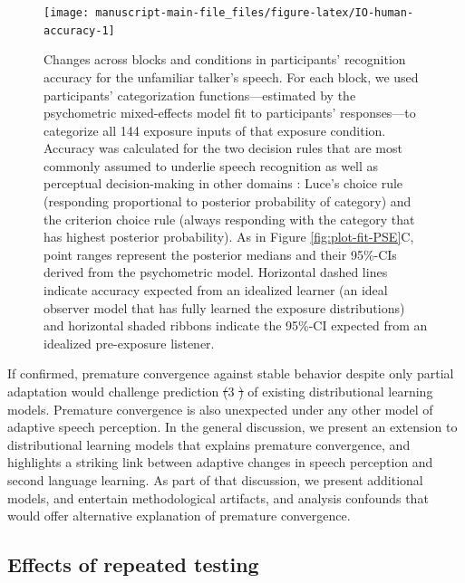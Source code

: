 \documentclass[
  11pt,
  man,mask,floatsintext]{apa6}
\makeatletter
\providecommand{\DIFdel}[1]{{\protect\color{red}\sout{#1}}} %
\providecommand{\DIFdelbegin}{} %
\providecommand{\DIFdelend}{} %
\newcommand{\DIFscaledelfig}{0.5}
\newlength{\DIFdelgraphicswidth} %
\newlength{\DIFdelgraphicsheight} %
\newcommand{\DIFdelincludegraphics}[2][]{%
\sbox{\DIFdelgraphicsbox}{\DIFOincludegraphics[#1]{#2}}%
\settoboxwidth{\DIFdelgraphicswidth}{\DIFdelgraphicsbox} %
\settoboxtotalheight{\DIFdelgraphicsheight}{\DIFdelgraphicsbox} %
\scalebox{\DIFscaledelfig}{%
\parbox[b]{\DIFdelgraphicswidth}{\usebox{\DIFdelgraphicsbox}\\[-\baselineskip] \rule{\DIFdelgraphicswidth}{0em}}\llap{\resizebox{\DIFdelgraphicswidth}{\DIFdelgraphicsheight}{%
\setlength{\unitlength}{\DIFdelgraphicswidth}%
\begin{picture}(1,1)%
\thicklines\linethickness{2pt} %
{\color[rgb]{1,0,0}\put(0,0){\framebox(1,1){}}}%
{\color[rgb]{1,0,0}\put(0,0){\line( 1,1){1}}}%
{\color[rgb]{1,0,0}\put(0,1){\line(1,-1){1}}}%
\end{picture}%
}\hspace*{3pt}}} %
} %
\DeclareRobustCommand{\DIFdelbegin}{\DIFOdelbegin \let\includegraphics\DIFdelincludegraphics} %
\DeclareRobustCommand{\DIFdelend}{\DIFOaddend \let\includegraphics\DIFOincludegraphics} %
\let\sout@orig\sout %
\renewcommand{\sout}[1]{\ifmmode\text{\sout@orig{\ensuremath{#1}}}\else\sout@orig{#1}\fi} %
\makeatother
\begin{document}
\begin{figure}[!ht]

{\centering \texttt{[image: manuscript-main-file\_files/figure-latex/IO-human-accuracy-1]} 

}

\caption{Changes across blocks and conditions in participants' recognition accuracy for the unfamiliar talker's speech. For each block, we used participants' categorization functions---estimated by the psychometric mixed-effects model fit to participants' responses---to categorize all 144 exposure inputs of that exposure condition. Accuracy was calculated for the two decision rules that are most commonly assumed to underlie speech recognition as well as perceptual decision-making in other domains \autocite[for review, see][]{massaro-friedman1990}: Luce's choice rule (responding proportional to posterior probability of category) and the criterion choice rule (always responding with the category that has highest posterior probability). As in Figure \ref{fig:plot-fit-PSE}C, point ranges represent the posterior medians and their 95\%-CIs derived from the psychometric model. Horizontal dashed lines indicate accuracy expected from an idealized learner (an ideal observer model that has fully learned the exposure distributions) and horizontal shaded ribbons indicate the 95\%-CI expected from an idealized pre-exposure listener.}\label{fig:IO-human-accuracy}
\end{figure}

If confirmed, premature convergence against stable behavior despite only partial adaptation would challenge prediction \DIFdelbegin \DIFdel{(}\DIFdelend 3 \DIFdelbegin \DIFdel{) }\DIFdelend of existing distributional learning models. Premature convergence is also unexpected under any other model of adaptive speech perception. In the general discussion, we present an extension to distributional learning models that explains premature convergence, and highlights a striking link between adaptive changes in speech perception and second language learning. As part of that discussion, we present additional models, and entertain methodological artifacts, and analysis confounds that would offer alternative explanation of premature convergence.

\subsection{Effects of repeated testing}\label{effects-of-repeated-testing}
\end{document}
